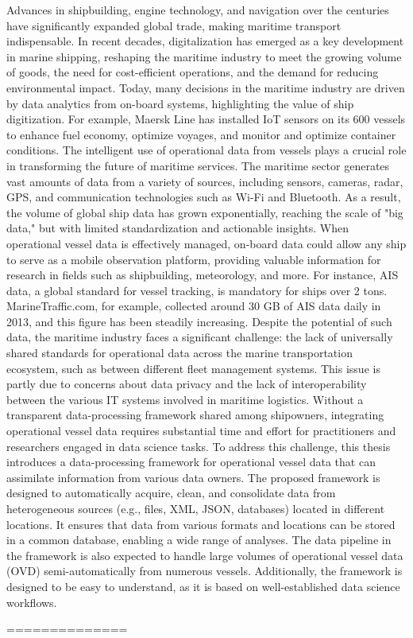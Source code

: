 Advances in shipbuilding, engine technology, and navigation over the centuries have significantly expanded global trade, making maritime transport indispensable. In recent decades, digitalization has emerged as a key development in marine shipping, reshaping the maritime industry to meet the growing volume of goods, the need for cost-efficient operations, and the demand for reducing environmental impact. Today, many decisions in the maritime industry are driven by data analytics from on-board systems, highlighting the value of ship digitization. For example, Maersk Line has installed IoT sensors on its 600 vessels to enhance fuel economy, optimize voyages, and monitor and optimize container conditions.
The intelligent use of operational data from vessels plays a crucial role in transforming the future of maritime services. The maritime sector generates vast amounts of data from a variety of sources, including sensors, cameras, radar, GPS, and communication technologies such as Wi-Fi and Bluetooth. As a result, the volume of global ship data has grown exponentially, reaching the scale of "big data," but with limited standardization and actionable insights. When operational vessel data is effectively managed, on-board data could allow any ship to serve as a mobile observation platform, providing valuable information for research in fields such as shipbuilding, meteorology, and more. For instance, AIS data, a global standard for vessel tracking, is mandatory for ships over 2 tons. MarineTraffic.com, for example, collected around 30 GB of AIS data daily in 2013, and this figure has been steadily increasing.
Despite the potential of such data, the maritime industry faces a significant challenge: the lack of universally shared standards for operational data across the marine transportation ecosystem, such as between different fleet management systems. This issue is partly due to concerns about data privacy and the lack of interoperability between the various IT systems involved in maritime logistics. Without a transparent data-processing framework shared among shipowners, integrating operational vessel data requires substantial time and effort for practitioners and researchers engaged in data science tasks.
To address this challenge, this thesis introduces a data-processing framework for operational vessel data that can assimilate information from various data owners. The proposed framework is designed to automatically acquire, clean, and consolidate data from heterogeneous sources (e.g., files, XML, JSON, databases) located in different locations. It ensures that data from various formats and locations can be stored in a common database, enabling a wide range of analyses. The data pipeline in the framework is also expected to handle large volumes of operational vessel data (OVD) semi-automatically from numerous vessels. Additionally, the framework is designed to be easy to understand, as it is based on well-established data science workflows.

==============